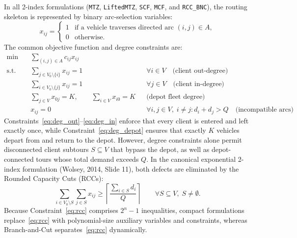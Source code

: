 \documentclass[11pt,a4paper]{article}
\begin{document}
In all 2-index formulations (\texttt{MTZ}, \texttt{LiftedMTZ}, \texttt{SCF}, \texttt{MCF}, and \texttt{RCC\_BNC}), the routing skeleton is represented by binary arc-selection variables:
\[
x_{ij} = \begin{cases}
1 & \text{if a vehicle traverses directed arc } (i, j) \in A, \\
0 & \text{otherwise.}
\end{cases}
\]
The common objective function and degree constraints are:
\begin{align}
\min \quad & \sum_{(i,j) \in A} c_{ij} x_{ij} \label{eq:obj_2idx} \\
\text{s.t.} \quad & \sum_{j \in V_0 \setminus \{i\}} x_{ij} = 1 && \forall i \in V \quad \text{(client out-degree)} \label{eq:deg_out} \\
& \sum_{i \in V_0 \setminus \{j\}} x_{ij} = 1 && \forall j \in V \quad \text{(client in-degree)} \label{eq:deg_in} \\
& \sum_{j \in V} x_{0j} = K, \qquad \sum_{i \in V} x_{i0} = K && \text{(depot fleet degree)} \label{eq:deg_depot} \\
& x_{ij} = 0 && \forall i, j \in V, \; i \neq j : d_i + d_j > Q \quad \text{(incompatible arcs)} \label{eq:incomp}
\end{align}
Constraints~\eqref{eq:deg_out}--\eqref{eq:deg_in} enforce that every client is entered and left exactly once, while Constraint~\eqref{eq:deg_depot} ensures that exactly $K$ vehicles depart from and return to the depot. However, degree constraints alone permit disconnected client subtours $S \subseteq V$ that bypass the depot, as well as depot-connected tours whose total demand exceeds $Q$. In the canonical exponential 2-index formulation (Wolsey, 2014, Slide 11), both defects are eliminated by the Rounded Capacity Cuts (RCCs):
\begin{equation}
\sum_{i \in V_0 \setminus S} \sum_{j \in S} x_{ij} \ge \left\lceil \frac{\sum_{i \in S} d_i}{Q} \right\rceil \qquad \forall S \subseteq V, \; S \neq \emptyset. \label{eq:rcc}
\end{equation}
Because Constraint~\eqref{eq:rcc} comprises $2^n - 1$ inequalities, compact formulations replace~\eqref{eq:rcc} with polynomial-size auxiliary variables and constraints, whereas Branch-and-Cut separates~\eqref{eq:rcc} dynamically.
\end{document}
